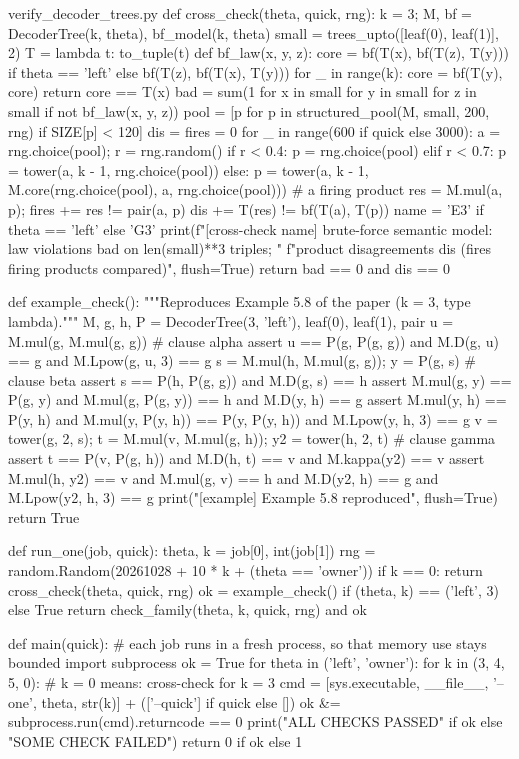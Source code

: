 \begin{filecontents*}[overwrite]{verify_decoder_trees.py}
def cross_check(theta, quick, rng):
    k = 3; M, bf = DecoderTree(k, theta), bf_model(k, theta)
    small = trees_upto([leaf(0), leaf(1)], 2)
    T = lambda t: to_tuple(t)
    def bf_law(x, y, z):
        core = bf(T(x), bf(T(z), T(y))) if theta == 'left' else bf(T(z), bf(T(x), T(y)))
        for _ in range(k): core = bf(T(y), core)
        return core == T(x)
    bad = sum(1 for x in small for y in small for z in small if not bf_law(x, y, z))
    pool = [p for p in structured_pool(M, small, 200, rng) if SIZE[p] < 120]
    dis = fires = 0
    for _ in range(600 if quick else 3000):
        a = rng.choice(pool); r = rng.random()
        if r < 0.4: p = rng.choice(pool)
        elif r < 0.7: p = tower(a, k - 1, rng.choice(pool))
        else: p = tower(a, k - 1, M.core(rng.choice(pool), a, rng.choice(pool)))   # a firing product
        res = M.mul(a, p); fires += res != pair(a, p)
        dis += T(res) != bf(T(a), T(p))
    name = 'E3' if theta == 'left' else 'G3'
    print(f"[cross-check {name}] brute-force semantic model: law violations {bad} on {len(small)**3} triples; "
          f"product disagreements {dis} ({fires} firing products compared)", flush=True)
    return bad == 0 and dis == 0

def example_check():
    """Reproduces Example 5.8 of the paper (k = 3, type lambda)."""
    M, g, h, P = DecoderTree(3, 'left'), leaf(0), leaf(1), pair
    u = M.mul(g, M.mul(g, g))                                     # clause alpha
    assert u == P(g, P(g, g)) and M.D(g, u) == {g} and M.Lpow(g, u, 3) == g
    s = M.mul(h, M.mul(g, g)); y = P(g, s)                        # clause beta
    assert s == P(h, P(g, g)) and M.D(g, s) == {h}
    assert M.mul(g, y) == P(g, y) and M.mul(g, P(g, y)) == h and M.D(y, h) == {g}
    assert M.mul(y, h) == P(y, h) and M.mul(y, P(y, h)) == P(y, P(y, h)) and M.Lpow(y, h, 3) == g
    v = tower(g, 2, s); t = M.mul(v, M.mul(g, h)); y2 = tower(h, 2, t)   # clause gamma
    assert t == P(v, P(g, h)) and M.D(h, t) == {v} and M.kappa(y2) == {v}
    assert M.mul(h, y2) == v and M.mul(g, v) == h and M.D(y2, h) == {g} and M.Lpow(y2, h, 3) == g
    print("[example] Example 5.8 reproduced", flush=True)
    return True

def run_one(job, quick):
    theta, k = job[0], int(job[1])
    rng = random.Random(20261028 + 10 * k + (theta == 'owner'))
    if k == 0: return cross_check(theta, quick, rng)
    ok = example_check() if (theta, k) == ('left', 3) else True
    return check_family(theta, k, quick, rng) and ok

def main(quick):
    # each job runs in a fresh process, so that memory use stays bounded
    import subprocess
    ok = True
    for theta in ('left', 'owner'):
        for k in (3, 4, 5, 0):                     # k = 0 means: cross-check for k = 3
            cmd = [sys.executable, __file__, '--one', theta, str(k)] + (['--quick'] if quick else [])
            ok &= subprocess.run(cmd).returncode == 0
    print("ALL CHECKS PASSED" if ok else "SOME CHECK FAILED")
    return 0 if ok else 1


\end{filecontents*}
